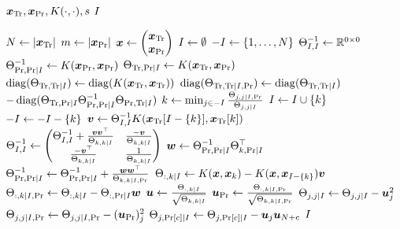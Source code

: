\begin{algorithmic}[1]
  \REQUIRE \( \bm{x}_{\text{Tr}}, \bm{x}_{\text{Pr}}, K(\cdot, \cdot), s \)
  \ENSURE \( I \)

  \STATE \( N \gets \lvert\bm{x}_{\text{Tr}}\rvert \)
  \STATE \( m \gets \lvert\bm{x}_{\text{Pr}}\rvert \)
  \STATE \(
    \bm{x} \gets
    \begin{pmatrix}
      \bm{x}_{\text{Tr}} \\
      \bm{x}_{\text{Pr}}
    \end{pmatrix}
  \)
  \STATE \( I \gets \emptyset \)
  \STATE \( -I \gets \{ 1, \dotsc, N \} \)
  \STATE \( \Theta_{I, I}^{-1} \gets \mathbb{R}^{0 \times 0} \)
  \STATE \(
    \Theta_{\text{Pr}, \text{Pr} \mid I}^{-1} \gets
    K(\bm{x}_{\text{Pr}}, \bm{x}_{\text{Pr}})
  \)
  \STATE \(
    \Theta_{\text{Tr}, \text{Pr} \mid I} \gets
    K(\bm{x}_{\text{Tr}}, \bm{x}_{\text{Pr}})
  \)
  \STATE \(
    \operatorname{diag}(\Theta_{\text{Tr}, \text{Tr} \mid I}) \gets
    \operatorname{diag}(K(\bm{x}_{\text{Tr}}, \bm{x}_{\text{Tr}}))
  \)
  \STATE \(
    \operatorname{diag}(\Theta_{\text{Tr}, \text{Tr} \mid I, \text{Pr}}) \gets
    \operatorname{diag}(\Theta_{\text{Tr}, \text{Tr} \mid I})
  \) \\  \(
    - \operatorname{diag}(
      \Theta_{\text{Tr}, \text{Pr} \mid I}
      \Theta_{\text{Pr}, \text{Pr} \mid I}^{-1}
      \Theta_{\text{Pr}, \text{Tr} \mid I}
    )
  \)
    \STATE \(
      k \gets \min_{j \in -I}
      \frac{\Theta_{j, j \mid I, \text{Pr}}}{\Theta_{j, j \mid I}}
    \)
    \STATE \( I \gets I \cup \{ k \} \)
    \STATE \( -I \gets -I - \{ k \} \)
    \STATE \(
      \bm{v} \gets \Theta_{I, I}^{-1}
      K(\bm{x}_{\text{Tr}}[I - \{ k \}], \bm{x}_{\text{Tr}}[k])
    \)
    \STATE \(
      \Theta_{I, I}^{-1} \gets
      \begin{pmatrix}
        \Theta_{I, I}^{-1} +
        \frac{\bm{v} \bm{v}^{\top}}{\Theta_{k, k \mid I}} &
        \frac{-\bm{v}}{\Theta_{k, k \mid I}} \\
        \frac{-\bm{v}^{\top}}{\Theta_{k, k \mid I}} &
        \frac{1}{\Theta_{k, k \mid I}}
      \end{pmatrix}
    \)
    \STATE \(
      \bm{w} \gets \Theta_{\text{Pr}, \text{Pr} \mid I}^{-1}
      \Theta_{k, \text{Pr} \mid I}^{\top}
    \)
    \STATE \(
      \Theta_{\text{Pr}, \text{Pr} \mid I}^{-1} \gets
      \Theta_{\text{Pr}, \text{Pr} \mid I}^{-1} +
      \frac{\bm{w} \bm{w}^{\top}}{\Theta_{k, k \mid I, \text{Pr}}}
    \)
    \STATE \(
      \Theta_{:, k \mid I} \gets
        K(\bm{x}, \bm{x}_k) -
        K(\bm{x}, \bm{x}_{I - \{ k \}}) \bm{v}
    \)
    \STATE \(
        \Theta_{:, k \mid I, \text{Pr}} \gets
        \Theta_{:, k \mid I} -
        \Theta_{:, \text{Pr} \mid I} \bm{w}
    \)
    \STATE \(
      \bm{u} \gets
      \frac{\Theta_{:, k \mid I}}{\sqrt{\Theta_{k, k \mid I}}}
    \)
    \STATE \(
      \bm{u}_{\text{Pr}} \gets
      \frac{\Theta_{:, k \mid I, \text{Pr}}}
            {\sqrt{\Theta_{k, k \mid I, \text{Pr}}}}
    \)
      \STATE \(
        \Theta_{j, j \mid I} \gets
        \Theta_{j, j \mid I} -
        \bm{u}_j^2
      \)
      \STATE \(
        \Theta_{j, j \mid I, \text{Pr}} \gets
        \Theta_{j, j \mid I, \text{Pr}} -
        (\bm{u}_{\text{Pr}})_j^2
      \)
        \STATE \(
          \Theta_{j, \text{Pr}[c] \mid I} \gets
          \Theta_{j, \text{Pr}[c] \mid I} -
          \bm{u}_j \bm{u}_{N + c}
        \)
      \ENDFOR
    \ENDFOR
  \ENDWHILE
  \RETURN \( I \)
\end{algorithmic}
